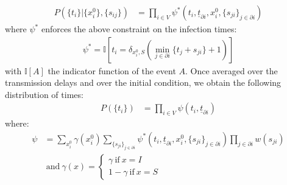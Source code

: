 \documentclass[a4paper, amsfonts, amssymb, amsmath, reprint, showkeys, nofootinbib, twoside, floatfix, pre,superscriptaddress]{revtex4-2}
\begin{document}
\begin{align*}
	P(\{t_i\}|\{x_i^0\},\{s_{ij}\})&=\prod_{i\in V}	\psi^*(t_i, \underline{t}_{\partial i}, x_i^0, \{s_{ji}\}_{j\in\partial i}) 
\end{align*}
where $\psi^*$ enforces the above constraint on the infection times:
\begin{align}
	\label{eq:constraint_infection_times}
	\psi^*=\mathbb{I}[t_i=\delta_{x_i^0,S}(\min_{j\in\partial i}\{t_j+s_{ji}\}+1)]
\end{align}
with $\mathbb{I}[A]$ the indicator function of the event $A$.
Once averaged over the transmission delays and over the initial condition, we obtain the following distribution of times:
\begin{align}
	\label{eq:forward_averaged}
	P(\{t_i\})&=\prod_{i\in V}\psi(t_i, \underline{t}_{\partial i})
\end{align}
where:
\begin{align*}
	\psi&=\sum_{x_i^0}\gamma(x_i^0)\sum_{\{s_{ji}\}_{j\in\partial i}}\psi^*(t_i, \underline{t}_{\partial i}, x_i^0, \{s_{ji}\}_{j\in\partial i})\prod_{j\in\partial i}w(s_{ji})\\
	&\ \text{and} \ \gamma(x) = \begin{cases}
		\gamma \ \text{if} \ x=I \\
		1-\gamma \ \text{if} \ x=S
	\end{cases}
\end{align*}
\end{document}
